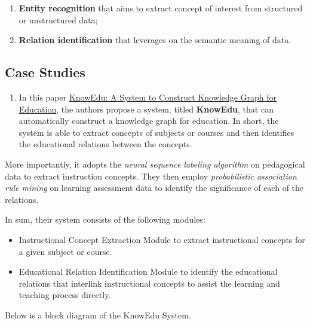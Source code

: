 \documentclass[]{book}
\providecommand{\tightlist}{%
  \setlength{\itemsep}{0pt}\setlength{\parskip}{0pt}}
\theoremstyle{definition}
\theoremstyle{definition}
\theoremstyle{definition}
\theoremstyle{remark}
\begin{document}
\begin{enumerate}
\def\labelenumi{\arabic{enumi}.}
\item
  \textbf{Entity recognition} that aims to extract concept of interest
  from structured or unstructured data;
\item
  \textbf{Relation identification} that leverages on the semantic
  meaning of data.
\end{enumerate}

\subsection{Case Studies}\label{case-studies}

\begin{enumerate}
\def\labelenumi{\arabic{enumi}.}
\tightlist
\item
  In this paper
  \href{https://ieeexplore.ieee.org/document/8362657}{KnowEdu: A System
  to Construct Knowledge Graph for Education}, the authors propose a
  system, titled \textbf{KnowEdu}, that can automatically construct a
  knowledge graph for education. In short, the system is able to extract
  concepts of subjects or courses and then identifies the educational
  relations between the concepts.
\end{enumerate}

More importantly, it adopts the \emph{neural sequence labeling
algorithm} on pedagogical data to extract instruction concepts. They
then employ \emph{probabilistic association rule mining} on learning
assessment data to identify the significance of each of the relations.

In sum, their system consists of the following modules:

\begin{itemize}
\item
  Instructional Concept Extraction Module to extract instructional
  concepts for a given subject or course.
\item
  Educational Relation Identification Module to identify the educational
  relations that interlink instructional concepts to assist the learning
  and teaching process directly.
\end{itemize}

Below is a block diagram of the KnowEdu System.
\end{document}
